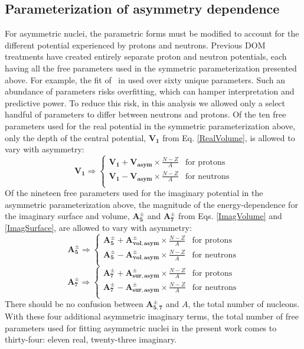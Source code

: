 \subsection{Parameterization of asymmetry dependence}
For asymmetric nuclei,
the parametric forms must be modified to account for the different potential experienced by 
protons and neutrons. Previous DOM treatments have created entirely separate
proton and neutron potentials, each having all the free parameters used in the symmetric
parameterization presented above. For example, the fit of \caEight\ in
\cite{MahzoonPhDThesis} used over sixty unique parameters. Such an abundance of
parameters risks overfitting, which can hamper interpretation and predictive power.
To reduce this risk, in this analysis we allowed only a select handful of parameters
to differ between neutrons and protons. Of the ten free parameters used for the real potential
in the symmetric parameterization above,
only the depth of the central potential,
$\bm{V_{1}}$ from Eq. \ref{RealVolume}, is allowed to vary with asymmetry:
\begin{equation}
    \bm{V_{1}} \Rightarrow \begin{cases}
        \bm{V_{1}} + \bm{V_{asym}}\times\frac{N-Z}{A} & \text{for protons}\\
        \bm{V_{1}} - \bm{V_{asym}}\times\frac{N-Z}{A} & \text{for neutrons}\\
    \end{cases}
\end{equation}
Of the nineteen free parameters used for the imaginary potential in the asymmetric parameterization
above, the magnitude of the energy-dependence for the imaginary surface and volume,
$\bm{A_{5}^{\pm}}$ and $\bm{A_{7}^{\pm}}$ from Eqs. \ref{ImagVolume} and \ref{ImagSurface},
are allowed to vary with asymmetry:
\begin{equation}
    \bm{A_{5}^{\pm}} \Rightarrow \begin{cases}
        \bm{A_{5}^{\pm}} + \bm{A_{vol, asym}^{\pm}}\times\frac{N-Z}{A} & \text{for protons}\\
        \bm{A_{5}^{\pm}} - \bm{A_{vol, asym}^{\pm}}\times\frac{N-Z}{A} & \text{for neutrons}\\
    \end{cases}
\end{equation}
\begin{equation}
    \bm{A_{7}^{\pm}} \Rightarrow \begin{cases}
        \bm{A_{7}^{\pm}} + \bm{A_{sur, asym}^{\pm}}\times\frac{N-Z}{A} & \text{for protons}\\
        \bm{A_{7}^{\pm}} - \bm{A_{sur, asym}^{\pm}}\times\frac{N-Z}{A} & \text{for neutrons}\\
    \end{cases}
\end{equation}
There should be no confusion between $\bm{A_{5,7}^{\pm}}$ and $A$, the total number of nucleons. 
With these four additional asymmetric imaginary terms, the total number of
free parameters used for
fitting asymmetric nuclei in the present work comes to thirty-four: eleven real, twenty-three imaginary.

